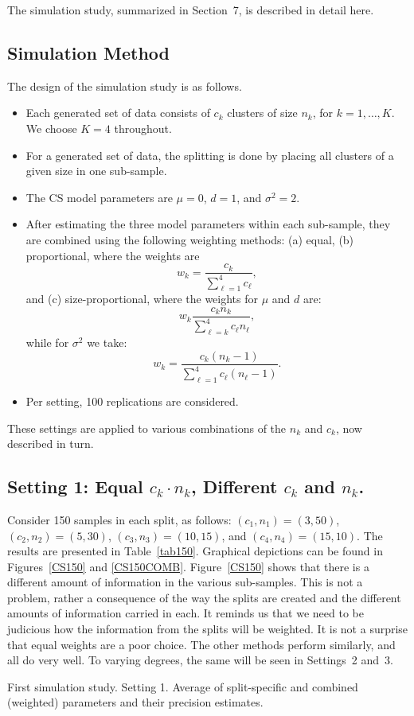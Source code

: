 \documentclass[11pt,a5paper,twoside]{book}
\begin{document}
{The simulation study, summarized in Section~7,
is described in detail here.

\subsection{Simulation Method}

The design of the simulation study is as follows.
\begin{itemize}
\item Each generated set of data consists of $c_k$ clusters of size $n_k$, for $k=1,\dots,K$. We choose $K=4$ throughout.
\item For a generated set of data, the splitting is done by placing all clusters of a given size in one sub-sample.
\item The CS model parameters are $\mu=0$, $d=1$, and $\sigma^2=2$.
\item After estimating the three model parameters within each sub-sample, they are combined using the following weighting methods: (a) equal, (b) proportional, where the weights are
$$w_k=\frac{c_k}{\sum_{\ell=1}^4 c_\ell},$$
and (c) size-proportional, where the weights for $\mu$ and $d$ are:
$$w_k\frac{c_k n_k}{\sum_{\ell=k}^4 c_\ell n_\ell},$$
while for $\sigma^2$ we take:
$$w_k=\frac{c_k (n_k-1)}{\sum_{\ell=1}^4 c_\ell (n_\ell-1)}.$$
\item Per setting, 100 replications are considered.
\end{itemize}
These settings are applied to various combinations of the $n_k$ and $c_k$, now described in turn.




\subsection[Setting 1]{Setting 1: Equal $c_k\cdot n_k$, Different $c_k$ and $n_k$.}

Consider  150 samples in each split, as follows: $(c_1,n_1)=(3,50)$, $(c_2,n_2)=(5,30)$, $(c_3,n_3)=(10,15)$, and $(c_4,n_4)=(15,10)$. The results are presented in Table~\ref{tab150}.  Graphical depictions can be found in Figures~\ref{CS150} and \ref{CS150COMB}. Figure~\ref{CS150} shows that there is a different amount of information in the various sub-samples. This is not a problem, rather a consequence of the way the splits are created and the different amounts of information carried in each. It reminds us that we need to be judicious how the information from the splits will be weighted. It is  not a surprise that equal weights are a poor choice. The other methods perform similarly, and all do very well. To varying degrees, the same will be seen in Settings~2 and~3.
\begin{table}[h]
\caption{\label{tab150}\label{tab150comb} \small \linespread{1.1} First simulation study. Setting 1. Average of split-specific and combined (weighted) parameters and their precision estimates.}


\end{table}}
\end{document}
